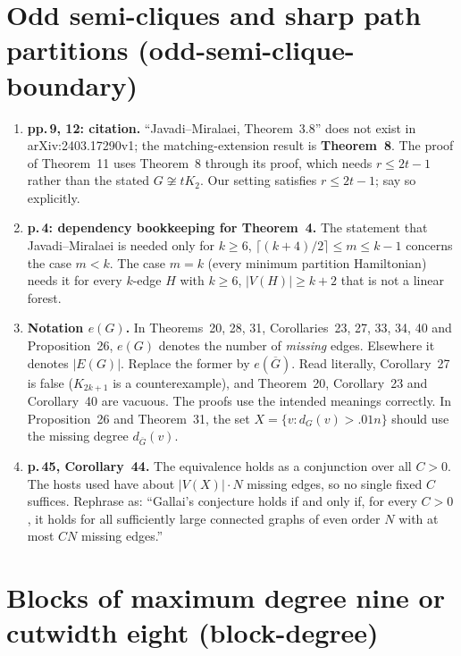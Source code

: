 \documentclass[11pt]{amsart}
\begin{document}
\section{Odd semi-cliques and sharp path partitions (odd-semi-clique-boundary)}

\begin{enumerate}
\item \textbf{pp.\,9, 12: citation.} ``Javadi--Miralaei, Theorem~3.8'' does not exist in
arXiv:2403.17290v1; the matching-extension result is \textbf{Theorem~8}. The proof of Theorem~11 uses
Theorem~8 through its proof, which needs $r\le 2t-1$ rather than the stated $G\not\cong tK_2$. Our
setting satisfies $r\le2t-1$; say so explicitly.
\item \textbf{p.\,4: dependency bookkeeping for Theorem~4.} The statement that Javadi--Miralaei is needed
only for $k\ge6$, $\lceil (k+4)/2\rceil\le m\le k-1$ concerns the case $m<k$. The case $m=k$ (every
minimum partition Hamiltonian) needs it for every $k$-edge $H$ with $k\ge6$, $|V(H)|\ge k+2$ that is
not a linear forest.
\item \textbf{Notation $e(G)$.} In Theorems~20, 28, 31, Corollaries~23, 27, 33, 34, 40 and Proposition~26,
$e(G)$ denotes the number of \emph{missing} edges. Elsewhere it denotes $|E(G)|$. Replace the former by
$e(\overline G)$. Read literally, Corollary~27 is false ($K_{2k+1}$ is a counterexample), and
Theorem~20, Corollary~23 and Corollary~40 are vacuous. The proofs use the intended meanings correctly.
In Proposition~26 and Theorem~31, the set $X=\{v:d_G(v)>.01n\}$ should use the missing degree
$d_{\overline G}(v)$.
\item \textbf{p.\,45, Corollary~44.} The equivalence holds as a conjunction over all $C>0$. The hosts
used have about $|V(X)|\cdot N$ missing edges, so no single fixed $C$ suffices. Rephrase as: ``Gallai's
conjecture holds if and only if, for every $C>0$, it holds for all sufficiently large connected graphs
of even order $N$ with at most $CN$ missing edges.''
\end{enumerate}

\section{Blocks of maximum degree nine or cutwidth eight (block-degree)}
\end{document}
